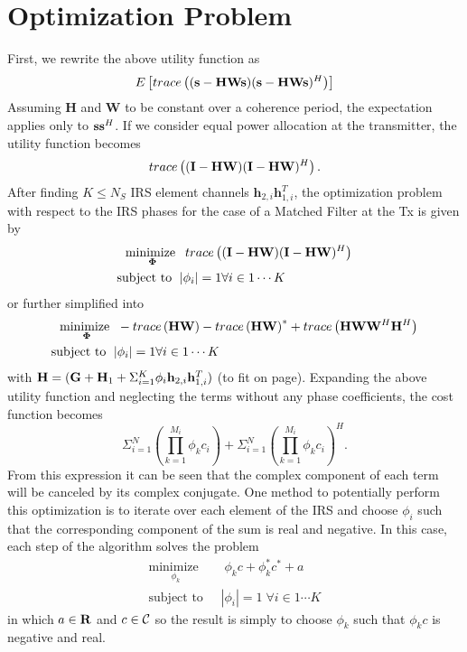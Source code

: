 \documentclass[12pt,a4paper]{report}
\begin{document}
\section{Optimization Problem}
First, we rewrite the above utility function as
	\begin{equation}
E\left[ \mathop{trace}\left((\mathbf{s} - \mathbf{H}\mathbf{W}\mathbf{s})(\mathbf{s} - \mathbf{H}\mathbf{W}\mathbf{s})^H \right)\right]
\end{equation}
Assuming $\mathbf{H}$ and $\mathbf{W}$ to be constant over a coherence period, the expectation applies only to $\mathbf{s} \mathbf{s}^H$. If we consider equal power allocation at the transmitter, the utility function becomes
	\begin{equation}
\mathop{trace}\left((\mathbf{I} - \mathbf{H}\mathbf{W})(\mathbf{I} - \mathbf{H}\mathbf{W})^H \right).
\end{equation}
After finding $K \leq N_S$ IRS element channels $\mathbf{h}_{2,i}\mathbf{h}^T_{1,i}$, the optimization problem with respect to the IRS phases for the case of a Matched Filter at the Tx is given by
	\begin{align}
	    \underset{\boldsymbol{\Phi}}{\text{minimize }}
	    & \; \mathop{trace}\left((\mathbf{I} - \mathbf{H}\mathbf{W})
	   (\mathbf{I} - \mathbf{H}\mathbf{W})^H \right)
	     \\
	    \text{subject to  } \; &
	    | \phi_i | = 1  \forall i \in {1 \cdots	 K}
	\end{align}\label{mse_problem}
	or further simplified into
		\begin{align}
	    \underset{\boldsymbol{\Phi}}{\text{minimize }}
	    & \; - \mathop{trace} \left( \mathbf{H}\mathbf{W}\right) - \mathop{trace} \left( \mathbf{H}\mathbf{W}\right)^* +
	    \mathop{trace}\left(\mathbf{H}\mathbf{W} \mathbf{W}^H \mathbf{H}^H\right)
	     \\
	    \text{subject to  } \; &
	    | \phi_i | = 1  \forall i \in {1 \cdots	 K}
	\end{align}\label{mse_problem_full}
	with $\mathbf{H} = (\mathbf{G} +  \mathbf{H}_1 + \Sigma_{i=1}^{K} \phi_i \mathbf{h}_{2,i}\mathbf{h}^T_{1,i})$ (to fit on page).
	Expanding the above utility function and neglecting the terms without any phase coefficients, the cost function becomes
	\begin{equation}
	\Sigma_{i=1}^{N} \left(\prod_{k=1}^{M_i}\phi_{k} c_i \right ) +  \Sigma_{i=1}^{N} \left(\prod_{k=1}^{M_i}\phi_{k} c_i \right)^H.
	\end{equation}
	From this expression it can be seen that the complex component of each term will be canceled by its complex conjugate.
	One method to potentially perform this optimization is to iterate over each element of the IRS and choose $\phi_{i}$ such that 
	the corresponding component of the sum is real and negative. In this case, each step of the algorithm solves the problem
			\begin{align}
	    \underset{\phi_k}{\text{minimize }}
	    & \; \phi_k c + \phi_k^* c^* + a 
	     \\
	    \text{subject to  } \; &
	    | \phi_i | = 1   \; \forall i \in {1 \cdots	 K}
	\end{align}\label{mse_problem_s}
	in which $a \in {\mbox{\bf R}}$ and $c \in \mathcal{C}$ so the result is simply to choose $\phi_k$ such that $\phi_k c$ is negative and real.
\end{document}
